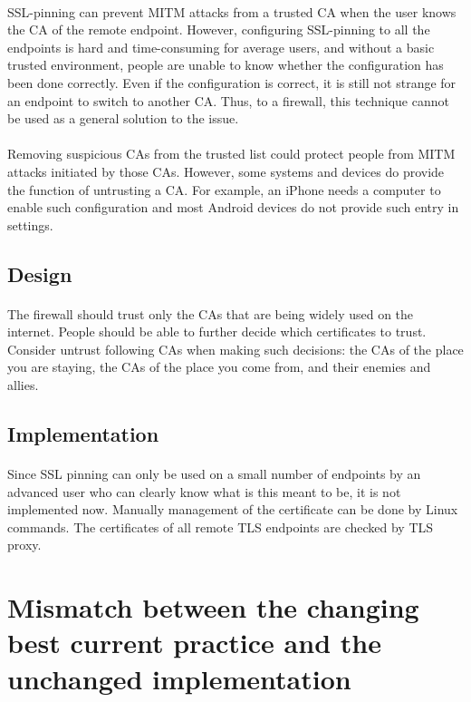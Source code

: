 \documentclass[mscthesis]{usiinfthesis}
\begin{document}
\paragraph{}
SSL-pinning can prevent MITM attacks from a trusted CA when the user knows the CA of the remote endpoint. However, configuring SSL-pinning to all the endpoints is hard and time-consuming for average users, and without a basic trusted environment, people are unable to know whether the configuration has been done correctly. Even if the configuration is correct, it is still not strange for an endpoint to switch to another CA. Thus, to a firewall, this technique cannot be used as a general solution to the issue.
\paragraph{}
Removing suspicious CAs from the trusted list could protect people from MITM attacks initiated by those CAs. However, some systems and devices do provide the function of untrusting a CA. For example, an iPhone needs a computer to enable such configuration and most Android devices do not provide such entry in settings.
\subsection{Design}
\paragraph{}
The firewall should trust only the CAs that are being widely used on the internet. People should be able to further decide which certificates to trust. Consider untrust following CAs when making such decisions: the CAs of the place you are staying, the CAs of the place you come from, and their enemies and allies.
\subsection{Implementation}
\paragraph{}
Since SSL pinning can only be used on a small number of endpoints by an advanced user who can clearly know what is this meant to be, it is not implemented now. Manually management of the certificate can be done by Linux commands. The certificates of all remote TLS endpoints are checked by TLS proxy.

\section{Mismatch between the changing best current practice and the unchanged implementation}
\end{document}
